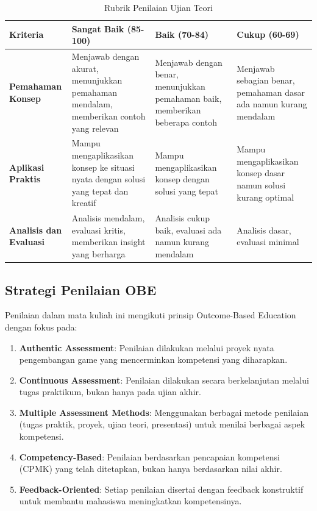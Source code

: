 \documentclass[a4paper,12pt]{article}
\begin{document}
\begin{table}[h]
\centering
\caption{Rubrik Penilaian Ujian Teori}
\label{tab:rubrik_ujian}
\small
\begin{tabular}{|p{2cm}|p{3.5cm}|p{3.5cm}|p{3.5cm}|}
\hline
\textbf{Kriteria} & \textbf{Sangat Baik (85-100)} & \textbf{Baik (70-84)} & \textbf{Cukup (60-69)} \\
\hline
\textbf{Pemahaman Konsep} & Menjawab dengan akurat, menunjukkan pemahaman mendalam, memberikan contoh yang relevan & Menjawab dengan benar, menunjukkan pemahaman baik, memberikan beberapa contoh & Menjawab sebagian benar, pemahaman dasar ada namun kurang mendalam \\
\hline
\textbf{Aplikasi Praktis} & Mampu mengaplikasikan konsep ke situasi nyata dengan solusi yang tepat dan kreatif & Mampu mengaplikasikan konsep dengan solusi yang tepat & Mampu mengaplikasikan konsep dasar namun solusi kurang optimal \\
\hline
\textbf{Analisis dan Evaluasi} & Analisis mendalam, evaluasi kritis, memberikan insight yang berharga & Analisis cukup baik, evaluasi ada namun kurang mendalam & Analisis dasar, evaluasi minimal \\
\hline
\end{tabular}
\end{table}

\subsection{Strategi Penilaian OBE}

Penilaian dalam mata kuliah ini mengikuti prinsip Outcome-Based Education dengan fokus pada:

\begin{enumerate}
\item \textbf{Authentic Assessment}: Penilaian dilakukan melalui proyek nyata pengembangan game yang mencerminkan kompetensi yang diharapkan.

\item \textbf{Continuous Assessment}: Penilaian dilakukan secara berkelanjutan melalui tugas praktikum, bukan hanya pada ujian akhir.

\item \textbf{Multiple Assessment Methods}: Menggunakan berbagai metode penilaian (tugas praktik, proyek, ujian teori, presentasi) untuk menilai berbagai aspek kompetensi.

\item \textbf{Competency-Based}: Penilaian berdasarkan pencapaian kompetensi (CPMK) yang telah ditetapkan, bukan hanya berdasarkan nilai akhir.

\item \textbf{Feedback-Oriented}: Setiap penilaian disertai dengan feedback konstruktif untuk membantu mahasiswa meningkatkan kompetensinya.
\end{enumerate}
\end{document}
